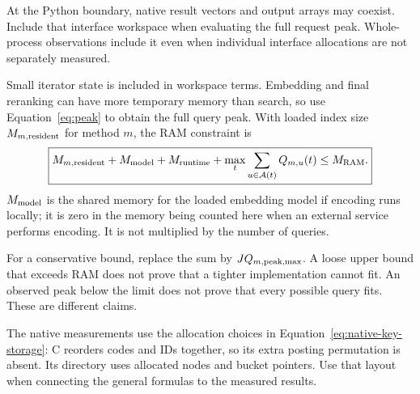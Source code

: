 At the Python boundary, native result vectors and output arrays may coexist. Include that
interface workspace when evaluating the full request peak. Whole-process observations include
it even when individual interface allocations are not separately measured.

Small iterator state is included in workspace terms. Embedding and final reranking can have
more temporary memory than search, so use Equation~\eqref{eq:peak} to obtain the full query peak.
With loaded index size $M_{m,\rm resident}$ for method $m$, the RAM constraint is
\begin{equation}
\boxed{M_{m,\rm resident}+M_{\rm model}+M_{\rm runtime}
       +\max_t\sum_{u\in\mathcal A(t)}Q_{m,u}(t)\leq M_{\rm RAM}.}
\label{eq:final-ram}
\end{equation}
$M_{\rm model}$ is the shared memory for the loaded embedding model if encoding runs locally; it is zero in the memory being counted here when an external service performs encoding. It is not multiplied by the number of queries.

For a conservative bound, replace the sum by $JQ_{m,\rm peak,max}$. A loose upper bound that
exceeds RAM does not prove that a tighter implementation cannot fit. An observed peak below
the limit does not prove that every possible query fits. These are different claims.

The native measurements use the allocation choices in Equation~\eqref{eq:native-key-storage}:
C reorders codes and IDs together, so its extra posting permutation is absent. Its directory
uses allocated nodes and bucket pointers. Use that layout when connecting the general formulas
to the measured results.

